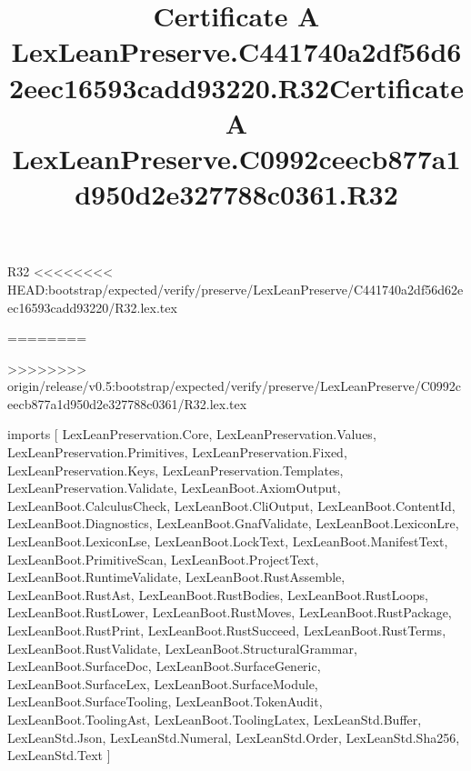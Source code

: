 \begin{lexlean}{R32}
<<<<<<<< HEAD:bootstrap/expected/verify/preserve/LexLeanPreserve/C441740a2df56d62eec16593cadd93220/R32.lex.tex
\title{Certificate A LexLeanPreserve.C441740a2df56d62eec16593cadd93220.R32}
========
\title{Certificate A LexLeanPreserve.C0992ceecb877a1d950d2e327788c0361.R32}
>>>>>>>> origin/release/v0.5:bootstrap/expected/verify/preserve/LexLeanPreserve/C0992ceecb877a1d950d2e327788c0361/R32.lex.tex
\begin{coremodule}
imports [
  LexLeanPreservation.Core,
  LexLeanPreservation.Values,
  LexLeanPreservation.Primitives,
  LexLeanPreservation.Fixed,
  LexLeanPreservation.Keys,
  LexLeanPreservation.Templates,
  LexLeanPreservation.Validate,
  LexLeanBoot.AxiomOutput,
  LexLeanBoot.CalculusCheck,
  LexLeanBoot.CliOutput,
  LexLeanBoot.ContentId,
  LexLeanBoot.Diagnostics,
  LexLeanBoot.GnafValidate,
  LexLeanBoot.LexiconLre,
  LexLeanBoot.LexiconLse,
  LexLeanBoot.LockText,
  LexLeanBoot.ManifestText,
  LexLeanBoot.PrimitiveScan,
  LexLeanBoot.ProjectText,
  LexLeanBoot.RuntimeValidate,
  LexLeanBoot.RustAssemble,
  LexLeanBoot.RustAst,
  LexLeanBoot.RustBodies,
  LexLeanBoot.RustLoops,
  LexLeanBoot.RustLower,
  LexLeanBoot.RustMoves,
  LexLeanBoot.RustPackage,
  LexLeanBoot.RustPrint,
  LexLeanBoot.RustSucceed,
  LexLeanBoot.RustTerms,
  LexLeanBoot.RustValidate,
  LexLeanBoot.StructuralGrammar,
  LexLeanBoot.SurfaceDoc,
  LexLeanBoot.SurfaceGeneric,
  LexLeanBoot.SurfaceLex,
  LexLeanBoot.SurfaceModule,
  LexLeanBoot.SurfaceTooling,
  LexLeanBoot.TokenAudit,
  LexLeanBoot.ToolingAst,
  LexLeanBoot.ToolingLatex,
  LexLeanStd.Buffer,
  LexLeanStd.Json,
  LexLeanStd.Numeral,
  LexLeanStd.Order,
  LexLeanStd.Sha256,
  LexLeanStd.Text
]


\end{coremodule}
\end{lexlean}
